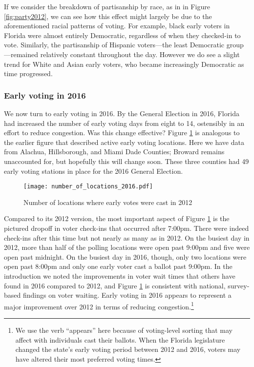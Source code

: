 \documentclass[12pt,titlepage]{article}
\begin{document}
If we consider the breakdown of partisanship by race, as in in Figure
\ref{fig:party2012}, we can see how this effect might largely be due
to the aforementioned racial patterns of voting.  For example, black
early voters in Florida were almost entirely Democratic, regardless of
when they checked-in to vote.  Similarly, the partisanship of Hispanic
voters---the least Democratic group---remained relatively constant
throughout the day.  However we do see a slight trend for White and
Asian early voters, who became increasingly Democratic as time
progressed.


\subsubsection*{Early voting in 2016}

We now turn to early voting in 2016.  By the General Election in 2016,
Florida had increased the number of early voting days from eight to
14, ostensibly in an effort to reduce congestion. Was this change
effective?  Figure \ref{fig:nrlocs2016} is analogous to the earlier
figure that described active early voting locations.  Here we have
data from Alachua, Hillsborough, and Miami Dade Counties; Broward
remains unaccounted for, but hopefully this will change soon.  These
three counties had 49 early voting stations in place for the 2016
General Election.

\begin{figure}[!ht]
\caption{Number of locations where early votes were cast in 2012}
  \label{fig:nrlocs2016}
  \centering
    \centering\texttt{[image: number\_of\_locations\_2016.pdf]}
\end{figure}

Compared to its 2012 version, the most important aspect of Figure
\ref{fig:nrlocs2016} is the pictured dropoff in voter check-ins that
occurred after 7:00pm.  There were indeed check-ins after this time
but not nearly as many as in 2012.  On the busiest day in 2012, more
than half of the polling locations were open past 9:00pm and five were
open past midnight.  On the busiest day in 2016, though, only two
locations were open past 8:00pm and only one early voter cast a ballot
past 9:00pm.  In the introduction we noted the improvements in voter
wait times that others have found in 2016 compared to 2012, and Figure
\ref{fig:nrlocs2016} is consistent with national, survey-based
findings on voter waiting.  Early voting in 2016 appears to represent
a major improvement over 2012 in terms of reducing
congestion.\footnote{We use the verb ``appears'' here because of
  voting-level sorting that may affect with individuals cast their
  ballots.  When the Florida legislature changed the state's early
  voting period between 2012 and 2016, voters may have altered their
  most preferred voting times.}
\end{document}
